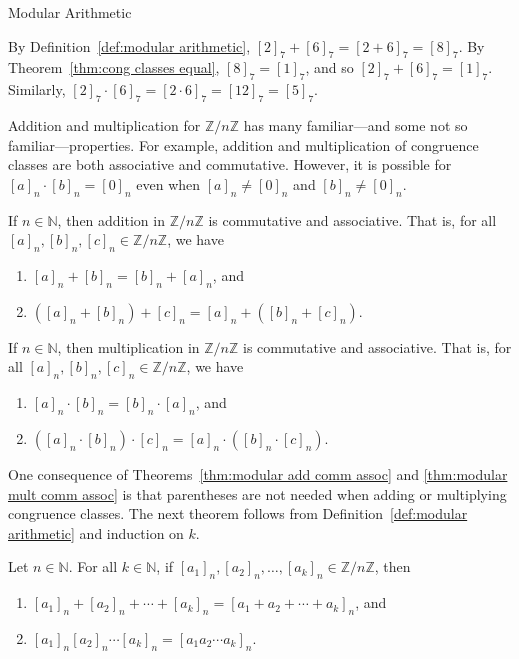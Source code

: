 \begin{section}{Modular Arithmetic}
\begin{example}
By Definition~\ref{def:modular arithmetic}, $[2]_7+[6]_7 = [2+6]_7 = [8]_7$. By Theorem~\ref{thm:cong classes equal}, $[8]_7 = [1]_7$, and so $[2]_7+[6]_7 = [1]_7$. Similarly, $[2]_7\cdot[6]_7 = [2\cdot6]_7 = [12]_7 = [5]_7$.
\end{example}

Addition and multiplication for $\mathbb{Z}/n\mathbb{Z}$ has many familiar---and some not so familiar---properties. For example, addition and multiplication of congruence classes are both associative and commutative. However, it is possible for $[a]_n\cdot[b]_n = [0]_n$ even when $[a]_n \neq [0]_n$ and $[b]_n \neq [0]_n$.

\begin{theorem}\label{thm:modular add comm assoc}
If $n\in \mathbb{N}$, then addition in $\mathbb{Z}/n\mathbb{Z}$ is commutative and associative. That is, for all $[a]_n, [b]_n, [c]_n \in \mathbb{Z}/n\mathbb{Z}$, we have
\begin{enumerate}[label=\textrm{(\alph*)}]
\item $[a]_n + [b]_n = [b]_n + [a]_n$, and
\item $([a]_n + [b]_n) + [c]_n = [a]_n + ([b]_n + [c]_n)$. 
\end{enumerate}
\end{theorem}

\begin{theorem}\label{thm:modular mult comm assoc}
If $n\in \mathbb{N}$, then multiplication in $\mathbb{Z}/n\mathbb{Z}$ is commutative and associative. That is, for all $[a]_n, [b]_n, [c]_n \in \mathbb{Z}/n\mathbb{Z}$, we have
\begin{enumerate}[label=\textrm{(\alph*)}]
\item $[a]_n \cdot [b]_n = [b]_n \cdot [a]_n$, and
\item $([a]_n \cdot [b]_n) \cdot [c]_n = [a]_n \cdot ([b]_n \cdot [c]_n)$.
\end{enumerate}
\end{theorem}

One consequence of Theorems~\ref{thm:modular add comm assoc} and \ref{thm:modular mult comm assoc} is that parentheses are not needed when adding or multiplying congruence classes.  The next theorem follows from Definition~\ref{def:modular arithmetic} and induction on $k$.

\begin{theorem}\label{thm:modular sums products}
Let $n\in \mathbb{N}$.  For all $k\in \mathbb{N}$, if $[a_1]_n,[a_2]_n,\ldots, [a_k]_n \in \mathbb{Z}/n\mathbb{Z}$, then 
\begin{enumerate}[label=\textrm{(\alph*)}]
\item $[a_1]_n+[a_2]_n+\cdots+ [a_k]_n = [a_1 + a_2 +\cdots+ a_k]_n$, and
\item $[a_1]_n [a_2]_n \cdots  [a_k]_n = [a_1 a_2 \cdots a_k]_n$.
\end{enumerate}
\end{theorem}


\end{section}
